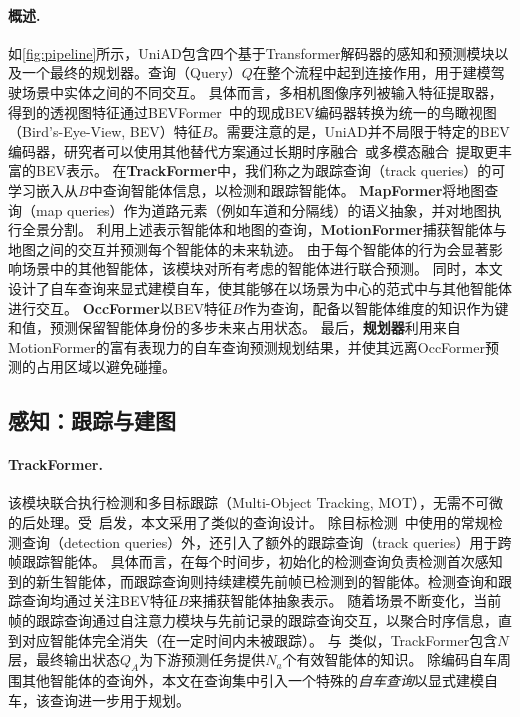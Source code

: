 \documentclass[10pt,twocolumn,letterpaper]{article}
\begin{document}
\paragraph{概述.} 如\cref{fig:pipeline}所示，UniAD包含四个基于Transformer解码器的感知和预测模块以及一个最终的规划器。查询（Query）$Q$在整个流程中起到连接作用，用于建模驾驶场景中实体之间的不同交互。
%
具体而言，多相机图像序列被输入特征提取器，得到的透视图特征通过BEVFormer~\cite{li2022bevformer}中的现成BEV编码器转换为统一的鸟瞰视图（Bird's-Eye-View, BEV）特征$B$。需要注意的是，UniAD并不局限于特定的BEV编码器，研究者可以使用其他替代方案通过长期时序融合~\cite{han2023exploring, park2022solofusion}或多模态融合~\cite{liu2022bevfusion, liang2022bevfusion}提取更丰富的BEV表示。
%
在\textbf{TrackFormer}中，我们称之为跟踪查询（track queries）的可学习嵌入从$B$中查询智能体信息，以检测和跟踪智能体。
%
\textbf{MapFormer}将地图查询（map queries）作为道路元素（例如车道和分隔线）的语义抽象，并对地图执行全景分割。
%
利用上述表示智能体和地图的查询，\textbf{MotionFormer}捕获智能体与地图之间的交互并预测每个智能体的未来轨迹。
%
由于每个智能体的行为会显著影响场景中的其他智能体，该模块对所有考虑的智能体进行联合预测。
%
同时，本文设计了自车查询来显式建模自车，使其能够在以场景为中心的范式中与其他智能体进行交互。
%
\textbf{OccFormer}以BEV特征$B$作为查询，配备以智能体维度的知识作为键和值，预测保留智能体身份的多步未来占用状态。
%
最后，\textbf{规划器}利用来自MotionFormer的富有表现力的自车查询预测规划结果，并使其远离OccFormer预测的占用区域以避免碰撞。


\subsection{感知：跟踪与建图}
\vspace{-4pt}
\paragraph{TrackFormer.} 该模块联合执行检测和多目标跟踪（Multi-Object Tracking, MOT），无需不可微的后处理。受~\cite{zeng2021motr, zhang2022mutr3d}启发，本文采用了类似的查询设计。
%
除目标检测~\cite{carion2020detr, zhu2020deformabledetr}中使用的常规检测查询（detection queries）外，还引入了额外的跟踪查询（track queries）用于跨帧跟踪智能体。
%
具体而言，在每个时间步，初始化的检测查询负责检测首次感知到的新生智能体，而跟踪查询则持续建模先前帧已检测到的智能体。检测查询和跟踪查询均通过关注BEV特征$B$来捕获智能体抽象表示。
%
随着场景不断变化，当前帧的跟踪查询通过自注意力模块与先前记录的跟踪查询交互，以聚合时序信息，直到对应智能体完全消失（在一定时间内未被跟踪）。
%
与~\cite{carion2020detr}类似，TrackFormer包含$N$层，最终输出状态$Q_A$为下游预测任务提供$N_a$个有效智能体的知识。
%
除编码自车周围其他智能体的查询外，本文在查询集中引入一个特殊的\textit{自车查询}以显式建模自车，该查询进一步用于规划。
\end{document}
